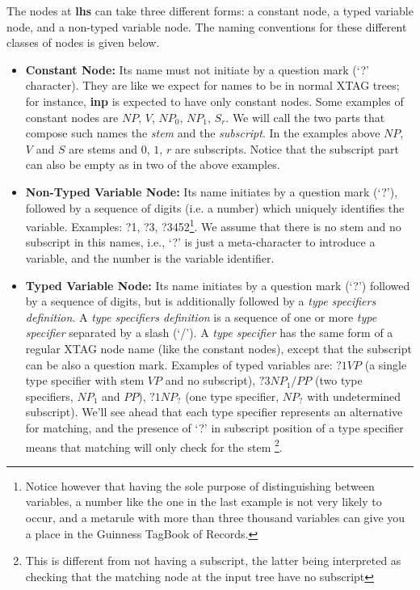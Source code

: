 The nodes at {\bf lhs} can take three 
different forms: a constant node, a typed variable node, and a non-typed 
variable node. The naming conventions for these different classes of nodes is 
given below.

\begin{itemize}

\item {\bf Constant Node:} Its name must not initiate by a question mark
        (`?' character). They are like we expect for names to be in normal
        XTAG trees; for instance, {\bf inp} is expected to have only constant
        nodes. Some examples of constant nodes are $NP$, $V$, $NP_0$, $NP_1$,
        $S_r$. We will call the two parts that compose such names
        the {\it stem} and the {\it subscript}.
        In the examples above  $NP$, $V$ and $S$ are stems and 
        $0$, $1$, $r$ are subscripts. Notice that the
        subscript part can also be empty as in two of the above examples.

\item {\bf Non-Typed Variable Node:} Its name initiates by a question 
        mark (`?'), followed by a sequence of digits (i.e. a number) which 
        uniquely identifies the variable. Examples: ?1, ?3, 
        ?3452\footnote{Notice
        however that having the sole purpose of distinguishing between 
        variables, a number like the one in the last example 
        is not very likely
        to occur, and a metarule with more than 
        three thousand variables can give
        you a place in the Guinness TagBook of Records.}. We assume that
        there is no stem and no subscript in this names, i.e., `?' is just
        a meta-character to introduce a variable, and the number is the 
        variable identifier. 

\item {\bf Typed Variable Node:} Its name initiates by a question mark (`?')
        followed by a sequence of digits, but is additionally followed by
        a {\it type specifiers definition}. A {\it type specifiers definition}
        is a sequence of one or more {\it type specifier} separated by a slash
        (`/'). A {\it type specifier} has the same form of a regular XTAG node
        name (like the constant nodes), except that the subscript can be also
        a question mark. Examples of typed variables are:
        $?1VP$ (a single type specifier with stem $VP$ and no subscript), 
        $?3NP_1/PP$ (two type specifiers, $NP_1$ and $PP$),
        $?1NP_?$ (one type specifier, $NP_?$ with undetermined subscript). 
        We'll see ahead that each type specifier represents an alternative
        for matching, and the presence of `?' in subscript position of a
        type specifier means that matching will only check for the stem
        \footnote{This is different from not having a subscript, the latter
	being
        interpreted as checking that the matching node at the
	input tree have no subscript}.
\end{itemize}

